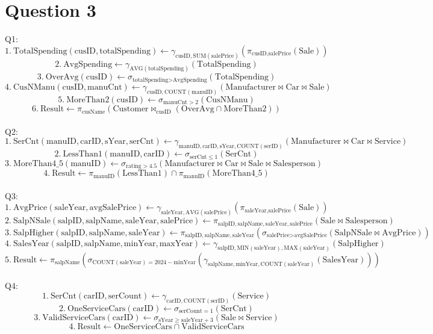 \documentclass{article}
\begin{document}
\section*{Question 3}
Q1: 
\[
1.\ \text{TotalSpending}(\text{cusID}, \text{totalSpending}) \leftarrow \gamma_{\text{cusID}, \text{SUM}(\text{salePrice})} (\pi_{\text{cusID}, \text{salePrice}} (\text{Sale}))
\]
\[
2.\ \text{AvgSpending} \leftarrow \gamma_{\text{AVG}(\text{totalSpending})} (\text{TotalSpending})
\]
\[
3.\ \text{OverAvg}(\text{cusID}) \leftarrow \sigma_{\text{totalSpending} > \text{AvgSpending}} (\text{TotalSpending})
\]
\[
4.\ \text{CusNManu}(\text{cusID}, \text{manuCnt}) \leftarrow \gamma_{\text{cusID}, \text{COUNT}(\text{manuID})} (\text{Manufacturer} \bowtie \text{Car} \bowtie \text{Sale})
\]
\[
5.\ \text{MoreThan2}(\text{cusID}) \leftarrow \sigma_{\text{manuCnt} > 2} (\text{CusNManu})
\]
\[
6.\ \text{Result} \leftarrow \pi_{\text{cusName}} (\text{Customer} \bowtie_{\text{cusID}} (\text{OverAvg} \cap \text{MoreThan2}))
\]
\\
Q2: 
\[
1.\ \text{SerCnt}(\text{manuID}, \text{carID}, \text{sYear}, \text{serCnt}) \leftarrow \gamma_{\text{manuID}, \text{carID}, \text{sYear}, \text{COUNT}(\text{serID})} (\text{Manufacturer} \bowtie \text{Car} \bowtie \text{Service})
\]
\[
2.\ \text{LessThan1}(\text{manuID}, \text{carID}) \leftarrow \sigma_{\text{serCnt} \leq 1} (\text{SerCnt})
\]
\[
3.\ \text{MoreThan4\_5}(\text{manuID}) \leftarrow \sigma_{\text{rating} > 4.5} (\text{Manufacturer} \bowtie \text{Car} \bowtie \text{Sale} \bowtie \text{Salesperson})
\]
\[
4.\ \text{Result} \leftarrow \pi_{\text{manuID}} (\text{LessThan1}) \cap \pi_{\text{manuID}} (\text{MoreThan4\_5})
\]
\\
Q3: 
\[
1.\ \text{AvgPrice}(\text{saleYear}, \text{avgSalePrice}) \leftarrow \gamma_{\text{saleYear}, \text{AVG}(\text{salePrice})} (\pi_{\text{saleYear}, \text{salePrice}} (\text{Sale}))
\]
\[
2.\ \text{SalpNSale}(\text{salpID}, \text{salpName}, \text{saleYear}, \text{salePrice}) \leftarrow \pi_{\text{salpID}, \text{salpName}, \text{saleYear}, \text{salePrice}} (\text{Sale} \bowtie \text{Salesperson})
\]
\[
3.\ \text{SalpHigher}(\text{salpID}, \text{salpName}, \text{saleYear}) \leftarrow \pi_{\text{salpID}, \text{salpName}, \text{saleYear}} (\sigma_{\text{salePrice} > \text{avgSalePrice}} (\text{SalpNSale} \bowtie \text{AvgPrice}))
\]
\[
4.\ \text{SalesYear}(\text{salpID}, \text{salpName}, \text{minYear}, \text{maxYear}) \leftarrow \gamma_{\text{salpID}, \text{MIN}(\text{saleYear}), \text{MAX}(\text{saleYear})} (\text{SalpHigher})
\]
\[
5.\ \text{Result} \leftarrow \pi_{\text{salpName}} (\sigma_{\text{COUNT}(\text{saleYear}) = 2024 - \text{minYear}} (\gamma_{\text{salpName}, \text{minYear}, \text{COUNT}(\text{saleYear})} (\text{SalesYear})))
\]
\\
Q4: 
\[
1.\ \text{SerCnt}(\text{carID}, \text{serCount}) \leftarrow \gamma_{\text{carID}, \text{COUNT}(\text{serID})} (\text{Service})
\]
\[
2.\ \text{OneServiceCars}(\text{carID}) \leftarrow \sigma_{\text{serCount} = 1} (\text{SerCnt})
\]
\[
3.\ \text{ValidServiceCars}(\text{carID}) \leftarrow \sigma_{\text{sYear} \geq \text{saleYear} + 3} (\text{Sale} \bowtie \text{Service})
\]
\[
4.\ \text{Result} \leftarrow \text{OneServiceCars} \cap \text{ValidServiceCars}
\]
\end{document}
